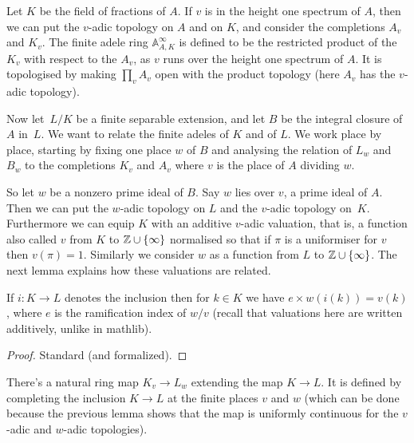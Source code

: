 Let $K$ be the field of fractions of $A$. If $v$ is in the height one spectrum of $A$,
then we can put the $v$-adic topology on $A$ and on $K$, and consider the completions
$A_v$ and $K_v$. The finite adele ring $\mathbb{A}_{A,K}^\infty$ is defined to be
the restricted product of the $K_v$ with respect to the $A_v$, as $v$ runs over
the height one spectrum of $A$. It is topologised by making $\prod_v A_v$ open with
the product topology (here $A_v$ has the $v$-adic topology).

Now let~$L/K$ be a finite separable extension, and let $B$ be the integral closure of~$A$ in~$L$.
We want to relate the finite adeles of $K$ and of $L$. We work place by place, starting by fixing
one place $w$ of $B$ and analysing the relation of $L_w$ and $B_w$ to the completions $K_v$
and $A_v$ where $v$ is the place of $A$ dividing $w$.

So let $w$ be a nonzero prime ideal of $B$. Say $w$ lies over $v$, a prime ideal of $A$.
Then we can put the $w$-adic topology on $L$ and the $v$-adic topology on~$K$. Furthermore
we can equip $K$ with an additive $v$-adic valuation, that is,
a function also called $v$ from $K$ to $\mathbb{Z}\cup\{\infty\}$ normalised so that if $\pi$ is a uniformiser
for $v$ then $v(\pi)=1$. Similarly we consider $w$ as a function from $L$ to $\mathbb{Z}\cup\{\infty\}$.
The next lemma explains how these valuations are related.

\begin{lemma}
  \label{IsDedekindDomain.HeightOneSpectrum.valuation_comap}
  \leanok
  If $i:K\to L$ denotes the inclusion then for $k\in K$ we have
  $e\times w(i(k))=v(k)$, where $e$ is the ramification index of $w/v$
  (recall that valuations here are written additively, unlike in mathlib).
\end{lemma}
\begin{proof}
  \leanok
  Standard (and formalized).
\end{proof}

\begin{definition}
  \label{IsDedekindDomain.HeightOneSpectrum.Extension.adicCompletionSemialgHom}
  \leanok
  There's a natural ring map $K_v\to L_w$ extending the map $K\to L$.
  It is defined by completing
  the inclusion $K\to L$ at the finite places $v$ and $w$ (which can be done
  because the previous lemma shows that the map is uniformly continuous for the $v$-adic
  and $w$-adic topologies).
\end{definition}

